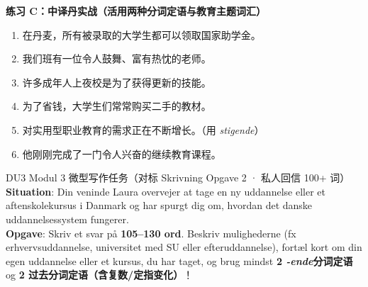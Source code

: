 \textbf{练习 C：中译丹实战（活用两种分词定语与教育主题词汇）}
\begin{enumerate}
  \item 在丹麦，所有被录取的大学生都可以领取国家助学金。
  \item 我们班有一位令人鼓舞、富有热忱的老师。
  \item 许多成年人上夜校是为了获得更新的技能。
  \item 为了省钱，大学生们常常购买二手的教材。
  \item 对实用型职业教育的需求正在不断增长。（用 \textit{stigende}）
  \item 他刚刚完成了一门令人兴奋的继续教育课程。
\end{enumerate}


\begin{emailbox}{DU3 Modul 3 微型写作任务（对标 Skrivning Opgave 2 · 私人回信 100+ 词）}
\textbf{Situation}: Din veninde Laura overvejer at tage en ny uddannelse eller et aftenskolekursus i Danmark og har spurgt dig om, hvordan det danske uddannelsessystem fungerer.\\
\textbf{Opgave}: Skriv et svar på \textbf{105--130 ord}. Beskriv mulighederne (fx erhvervsuddannelse, universitet med SU eller efteruddannelse), fortæl kort om din egen uddannelse eller et kursus, du har taget, og brug mindst \textbf{2 \textit{-ende}分词定语} og \textbf{2 过去分词定语（含复数/定指变化）}！
\end{emailbox}

